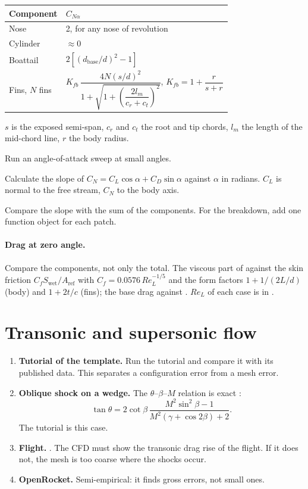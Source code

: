 \begin{tabularx}{\linewidth}{@{}l L@{}}
\toprule
Component & $C_{N\alpha}$ \\
\midrule
Nose & 2, for any nose of revolution \\
Cylinder & $\approx 0$ \\
Boattail & $2\left[(d_\text{base}/d)^2 - 1\right]$ \\
Fins, $N$ fins & $K_{fb}\,\dfrac{4N(s/d)^2}{1 + \sqrt{1 + \left(\dfrac{2 l_m}{c_r + c_t}\right)^2}}$, \quad $K_{fb} = 1 + \dfrac{r}{s + r}$ \\
\bottomrule
\end{tabularx}

\medskip
$s$ is the exposed semi-span, $c_r$ and $c_t$ the root and tip chords, $l_m$ the length
of the mid-chord line, $r$ the body radius.

\begin{steps}
\item Run an angle-of-attack sweep at small angles.
\item Calculate the slope of $C_N = C_L\cos\alpha + C_D\sin\alpha$ against $\alpha$ in
  radians. $C_L$ is normal to the free stream, $C_N$ to the body axis.
\item Compare the slope with the sum of the components. For the breakdown, add one
   function object for each patch.
\end{steps}

\paragraph{Drag at zero angle.} Compare the components, not only the total. The
viscous part of  against the skin friction $C_f S_\text{wet}/A_\text{ref}$
with $C_f = 0.0576\,Re_L^{-1/5}$ \citep[ch.~21]{schlichting1979} and the form factors
$1 + 1/(2L/d)$ (body) and $1 + 2t/c$ (fins); the base drag against
\citet[ch.~3]{hoerner1965}. $Re_L$ of each case is in .

\section{Transonic and supersonic flow}\label{sec:supersonic-validation}

\begin{enumerate}
\item \textbf{Tutorial of the template.} Run the  tutorial
   and compare it with its published data. This separates a
  configuration error from a mesh error.
\item \textbf{Oblique shock on a wedge.} The $\theta$--$\beta$--$M$ relation is exact
  \citep[ch.~4]{anderson2003}:
  \[
    \tan\theta = 2\cot\beta\,\frac{M^2\sin^2\beta - 1}{M^2(\gamma + \cos 2\beta) + 2}.
  \]
  The tutorial  is this case.
\item \textbf{Flight.} . The CFD must show the transonic drag rise
  of the flight. If it does not, the mesh is too coarse where the shocks occur.
\item \textbf{OpenRocket.} Semi-empirical: it finds gross errors, not small ones.
\end{enumerate}

